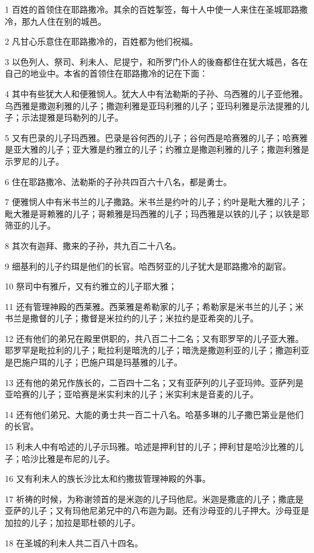 \par 1 百姓的首领住在耶路撒冷。其余的百姓掣签，每十人中使一人来住在圣城耶路撒冷，那九人住在别的城邑。
\par 2 凡甘心乐意住在耶路撒冷的，百姓都为他们祝福。
\par 3 以色列人、祭司、利未人、尼提宁，和所罗门仆人的後裔都住在犹大城邑，各在自己的地业中。本省的首领住在耶路撒冷的记在下面：
\par 4 其中有些犹大人和便雅悯人。犹大人中有法勒斯的子孙、乌西雅的儿子亚他雅。乌西雅是撒迦利雅的儿子；撒迦利雅是亚玛利雅的儿子；亚玛利雅是示法提雅的儿子；示法提雅是玛勒列的儿子。
\par 5 又有巴录的儿子玛西雅。巴录是谷何西的儿子；谷何西是哈赛雅的儿子；哈赛雅是亚大雅的儿子；亚大雅是约雅立的儿子；约雅立是撒迦利雅的儿子；撒迦利雅是示罗尼的儿子。
\par 6 住在耶路撒冷、法勒斯的子孙共四百六十八名，都是勇士。
\par 7 便雅悯人中有米书兰的儿子撒路。米书兰是约叶的儿子；约叶是毗大雅的儿子；毗大雅是哥赖雅的儿子；哥赖雅是玛西雅的儿子；玛西雅是以铁的儿子；以铁是耶筛亚的儿子。
\par 8 其次有迦拜、撒来的子孙，共九百二十八名。
\par 9 细基利的儿子约珥是他们的长官。哈西努亚的儿子犹大是耶路撒冷的副官。
\par 10 祭司中有雅斤，又有约雅立的儿子耶大雅；
\par 11 还有管理神殿的西莱雅。西莱雅是希勒家的儿子；希勒家是米书兰的儿子；米书兰是撒督的儿子；撒督是米拉约的儿子；米拉约是亚希突的儿子。
\par 12 还有他们的弟兄在殿里供职的，共八百二十二名；又有耶罗罕的儿子亚大雅。耶罗罕是毗拉利的儿子；毗拉利是暗洗的儿子；暗洗是撒迦利亚的儿子；撒迦利亚是巴施户珥的儿子；巴施户珥是玛基雅的儿子。
\par 13 还有他的弟兄作族长的，二百四十二名；又有亚萨列的儿子亚玛帅。亚萨列是亚哈赛的儿子；亚哈赛是米实利末的儿子；米实利末是音麦的儿子。
\par 14 还有他们弟兄、大能的勇士共一百二十八名。哈基多琳的儿子撒巴第业是他们的长官。
\par 15 利未人中有哈述的儿子示玛雅。哈述是押利甘的儿子；押利甘是哈沙比雅的儿子；哈沙比雅是布尼的儿子。
\par 16 又有利未人的族长沙比太和约撒拔管理神殿的外事。
\par 17 祈祷的时候，为称谢领首的是米迦的儿子玛他尼。米迦是撒底的儿子；撒底是亚萨的儿子；又有玛他尼弟兄中的八布迦为副。还有沙母亚的儿子押大。沙母亚是加拉的儿子；加拉是耶杜顿的儿子。
\par 18 在圣城的利未人共二百八十四名。
